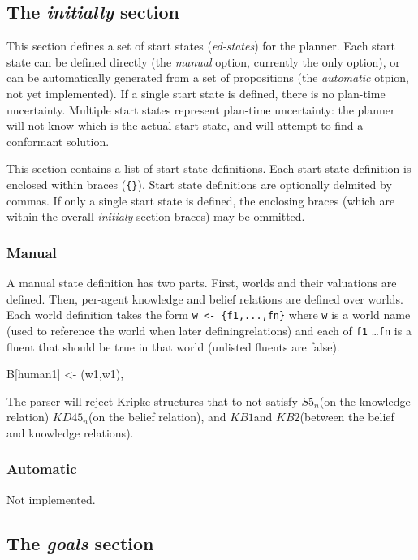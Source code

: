 \documentclass{article}
\newcommand{\kdff}{\ensuremath{KD45_n}}
\newcommand{\sfive}{\ensuremath{S5_n}}
\newcommand{\kbone}{\ensuremath{KB1}}
\newcommand{\kbtwo}{\ensuremath{KB2}}
\begin{document}
\subsection{The \emph{initially} section}

This section defines a set of start states (\emph{ed-states}) for the planner.
Each start state can be defined directly (the \emph{manual} option, currently the only option), or
can be automatically generated from a set of propositions (the \emph{automatic}
otpion, not yet implemented). If a single start state is defined, there is no
plan-time uncertainty. Multiple start states represent plan-time uncertainty:
the planner will not know which is the actual start state, and will attempt to
find a conformant solution.

This section contains a list of start-state definitions. Each start state
definition is enclosed within braces (\verb|{}|). Start state definitions are
optionally delmited by commas. If only a single start state is defined, the
enclosing braces (which are within the overall \emph{initialy} section braces)
may be ommitted.

\subsubsection{Manual}

A manual state definition has two parts. First, worlds and their valuations are
defined. Then, per-agent knowledge and belief relations are defined over worlds.
Each world definition takes the form
\verb|w <- {f1,...,fn}|
where \verb|w| is a world name (used to reference the world when later
definingrelations) and each of \verb|f1| \ldots \verb|fn| is a fluent 
that should be true in that world (unlisted fluents are false).

B[human1] <- {(w1,w1)},

The parser will reject Kripke structures that to not satisfy \sfive (on the
knowledge relation) \kdff (on the belief relation), and
\kbone and \kbtwo (between the belief and knowledge relations).

\subsubsection{Automatic}

Not implemented.


\subsection{The \emph{goals} section}
\end{document}
